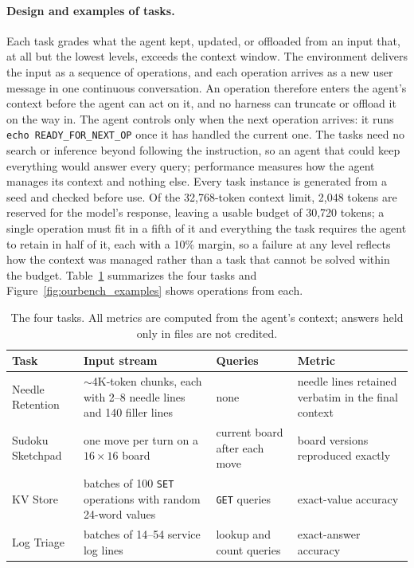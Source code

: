 \paragraph{Design and examples of \ourbench tasks.}
Each \ourbench{} task grades what the agent kept, updated, or offloaded from an input that, at all but the lowest levels, exceeds the context window. The environment delivers the input as a sequence of operations, and each operation arrives as a new user message in one continuous conversation. An operation therefore enters the agent's context before the agent can act on it, and no harness can truncate or offload it on the way in. The agent controls only when the next operation arrives: it runs \texttt{echo READY\_FOR\_NEXT\_OP} once it has handled the current one. The tasks need no search or inference beyond following the instruction, so an agent that could keep everything would answer every query; performance measures how the agent manages its context and nothing else. Every task instance is generated from a seed and checked before use. Of the 32{,}768-token context limit, 2{,}048 tokens are reserved for the model's response, leaving a usable budget of 30{,}720 tokens; a single operation must fit in a fifth of it and everything the task requires the agent to retain in half of it, each with a 10\% margin, so a failure at any level reflects how the context was managed rather than a task that cannot be solved within the budget. Table~\ref{tab:ourbench_tasks} summarizes the four tasks and Figure~\ref{fig:ourbench_examples} shows operations from each.

\begin{table}[h]
\centering
\footnotesize
\setlength{\tabcolsep}{4pt}
\begin{tabular}{@{}l>{\raggedright\arraybackslash}p{4.4cm}>{\raggedright\arraybackslash}p{3.3cm}>{\raggedright\arraybackslash}p{4.0cm}@{}}
\toprule
\textbf{Task} & \textbf{Input stream} & \textbf{Queries} & \textbf{Metric} \\
\midrule
Needle Retention & $\sim$4K-token chunks, each with 2--8 needle lines and 140 filler lines & none & needle lines retained verbatim in the final context \\
Sudoku Sketchpad & one move per turn on a $16{\times}16$ board & current board after each move & board versions reproduced exactly \\
KV Store & batches of 100 \texttt{SET} operations with random 24-word values & 24 \texttt{GET} queries & exact-value accuracy \\
Log Triage & batches of 14--54 service log lines & 24 lookup and count queries & exact-answer accuracy \\
\bottomrule
\end{tabular}
\caption{The four \ourbench{} tasks. All metrics are computed from the agent's context; answers held only in files are not credited.}
\label{tab:ourbench_tasks}
\end{table}


